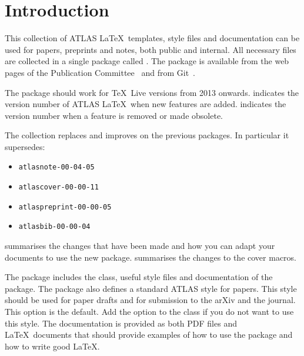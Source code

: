 
\section{Introduction}
\label{sec:intro}

This collection of ATLAS \LaTeX\ templates, style files and documentation
can be used for papers, preprints and notes, both public and internal. 
All necessary files are collected in a single package called .
The package is available from the web pages of the Publication Committee~\cite{pubcom} and from 
Git~\cite{pubcom-git}.

 The package should work for \TeX\ Live versions from 2013 onwards.
 indicates the version number of ATLAS \LaTeX\ when new features are added.
 indicates the version number when a feature is removed or made obsolete.

The collection replaces and improves on the previous packages.
In particular it supersedes:
\begin{itemize}\setlength{\parskip}{0pt}\setlength{\itemsep}{0pt}
\item \texttt{atlasnote-00-04-05}
\item \texttt{atlascover-00-00-11}
\item \texttt{atlaspreprint-00-00-05}
\item \texttt{atlasbib-00-00-04}
\end{itemize}
 summarises the changes that have been made and
how you can adapt your documents to use the new package.
 summarises the changes to the cover macros.

The package includes the  class, useful style files
and documentation of the package.
The package also defines a standard ATLAS style for papers.
This style should be used for paper drafts and for submission to the arXiv and the journal.
This option is the default. Add the option  to the  class if you do not want to use this style.
The documentation is provided as both PDF files and \LaTeX\ documents
that should provide examples of how to use the package and how to write
good \LaTeX.

